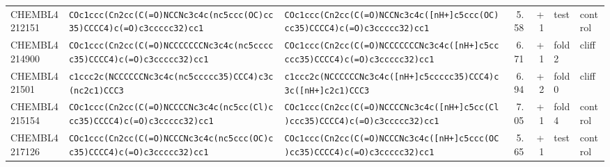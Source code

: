 \begin{longtable}{l p{4.4cm} p{4.4cm} r r l l}
CHEMBL4212151 & \texttt{COc1ccc(\allowbreak{}Cn2cc(\allowbreak{}C(\allowbreak{}=\allowbreak{}O)\allowbreak{}NCCNc3c4c(\allowbreak{}nc5ccc(\allowbreak{}OC)\allowbreak{}cc35)\allowbreak{}CCCC4)\allowbreak{}c(\allowbreak{}=\allowbreak{}O)\allowbreak{}c3ccccc32)\allowbreak{}cc1} & \texttt{COc1ccc(\allowbreak{}Cn2cc(\allowbreak{}C(\allowbreak{}=\allowbreak{}O)\allowbreak{}NCCNc3c4c(\allowbreak{}[nH+]\allowbreak{}c5ccc(\allowbreak{}OC)\allowbreak{}cc35)\allowbreak{}CCCC4)\allowbreak{}c(\allowbreak{}=\allowbreak{}O)\allowbreak{}c3ccccc32)\allowbreak{}cc1} & 5.58 & +1 & test & control \\
CHEMBL4214900 & \texttt{COc1ccc(\allowbreak{}Cn2cc(\allowbreak{}C(\allowbreak{}=\allowbreak{}O)\allowbreak{}NCCCCCCCNc3c4c(\allowbreak{}nc5ccccc35)\allowbreak{}CCCC4)\allowbreak{}c(\allowbreak{}=\allowbreak{}O)\allowbreak{}c3ccccc32)\allowbreak{}cc1} & \texttt{COc1ccc(\allowbreak{}Cn2cc(\allowbreak{}C(\allowbreak{}=\allowbreak{}O)\allowbreak{}NCCCCCCCNc3c4c(\allowbreak{}[nH+]\allowbreak{}c5ccccc35)\allowbreak{}CCCC4)\allowbreak{}c(\allowbreak{}=\allowbreak{}O)\allowbreak{}c3ccccc32)\allowbreak{}cc1} & 6.71 & +1 & fold 2 & cliff \\
CHEMBL421501 & \texttt{c1ccc2c(\allowbreak{}NCCCCCCNc3c4c(\allowbreak{}nc5ccccc35)\allowbreak{}CCC4)\allowbreak{}c3c(\allowbreak{}nc2c1)\allowbreak{}CCC3} & \texttt{c1ccc2c(\allowbreak{}NCCCCCCNc3c4c(\allowbreak{}[nH+]\allowbreak{}c5ccccc35)\allowbreak{}CCC4)\allowbreak{}c3c(\allowbreak{}[nH+]\allowbreak{}c2c1)\allowbreak{}CCC3} & 6.94 & +2 & fold 0 & cliff \\
CHEMBL4215154 & \texttt{COc1ccc(\allowbreak{}Cn2cc(\allowbreak{}C(\allowbreak{}=\allowbreak{}O)\allowbreak{}NCCCCNc3c4c(\allowbreak{}nc5cc(\allowbreak{}Cl)\allowbreak{}ccc35)\allowbreak{}CCCC4)\allowbreak{}c(\allowbreak{}=\allowbreak{}O)\allowbreak{}c3ccccc32)\allowbreak{}cc1} & \texttt{COc1ccc(\allowbreak{}Cn2cc(\allowbreak{}C(\allowbreak{}=\allowbreak{}O)\allowbreak{}NCCCCNc3c4c(\allowbreak{}[nH+]\allowbreak{}c5cc(\allowbreak{}Cl)\allowbreak{}ccc35)\allowbreak{}CCCC4)\allowbreak{}c(\allowbreak{}=\allowbreak{}O)\allowbreak{}c3ccccc32)\allowbreak{}cc1} & 7.05 & +1 & fold 4 & control \\
CHEMBL4217126 & \texttt{COc1ccc(\allowbreak{}Cn2cc(\allowbreak{}C(\allowbreak{}=\allowbreak{}O)\allowbreak{}NCCCNc3c4c(\allowbreak{}nc5ccc(\allowbreak{}OC)\allowbreak{}cc35)\allowbreak{}CCCC4)\allowbreak{}c(\allowbreak{}=\allowbreak{}O)\allowbreak{}c3ccccc32)\allowbreak{}cc1} & \texttt{COc1ccc(\allowbreak{}Cn2cc(\allowbreak{}C(\allowbreak{}=\allowbreak{}O)\allowbreak{}NCCCNc3c4c(\allowbreak{}[nH+]\allowbreak{}c5ccc(\allowbreak{}OC)\allowbreak{}cc35)\allowbreak{}CCCC4)\allowbreak{}c(\allowbreak{}=\allowbreak{}O)\allowbreak{}c3ccccc32)\allowbreak{}cc1} & 5.65 & +1 & test & control \\

\end{longtable}
